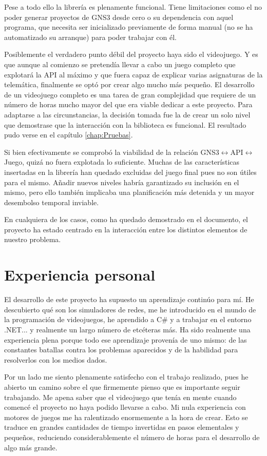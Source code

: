 Pese a todo ello la librería es plenamente funcional. Tiene limitaciones como el no poder generar proyectos de GNS3 desde cero o su dependencia con aquel programa, que necesita ser inicializado previamente de forma manual (no se ha automatizado su arranque) para poder trabajar con él.

Posiblemente el verdadero punto débil del proyecto haya sido el videojuego. Y es que aunque al comienzo se pretendía llevar a cabo un juego completo que explotará la API al máximo y que fuera capaz de explicar varias asignaturas de la telemática, finalmente se optó por crear algo mucho más pequeño. El desarrollo de un videojuego completo es una tarea de gran complejidad que requiere de un número de horas mucho mayor del que era viable dedicar a este proyecto. Para adaptarse a las circunstancias, la decisión tomada fue la de crear un solo nivel que demostrase que la interacción con la biblioteca es funcional. El resultado pudo verse en el capítulo \ref{chap:Pruebas}.

Si bien efectivamente se comprobó la viabilidad de la relación GNS3$\leftrightarrow$API$\leftrightarrow$Juego, quizá no fuera explotada lo suficiente. Muchas de las características insertadas en la librería han quedado excluidas del juego final pues no son útiles para el mismo. Añadir nuevos niveles habría garantizado su inclusión en el mismo, pero ello también implicaba una planificación más detenida y un mayor desembolso temporal inviable.

En cualquiera de los casos, como ha quedado demostrado en el documento, el proyecto ha estado centrado en la interacción entre los distintos elementos de nuestro problema.

\section{Experiencia personal}
El desarrollo de este proyecto ha supuesto un aprendizaje continúo para mí. He descubierto qué son los simuladores de redes, me he introducido en el mundo de la programación de videojuegos, he aprendido a C\# y a trabajar en el entorno .NET... y realmente un largo número de etcéteras más. Ha sido realmente una experiencia plena porque todo ese aprendizaje provenía de uno mismo: de las constantes batallas contra los problemas aparecidos y de la habilidad para resolverlos con los medios dados.

Por un lado me siento plenamente satisfecho con el trabajo realizado, pues he abierto un camino sobre el que firmemente pienso que es importante seguir trabajando. Me apena saber que el videojuego que tenía en mente cuando comencé el proyecto no haya podido llevarse a cabo. Mi nula experiencia con motores de juegos me ha ralentizado enormemente a la hora de crear. Esto se traduce en grandes cantidades de tiempo invertidas en pasos elementales y pequeños, reduciendo considerablemente el número de horas para el desarrollo de algo más grande.

